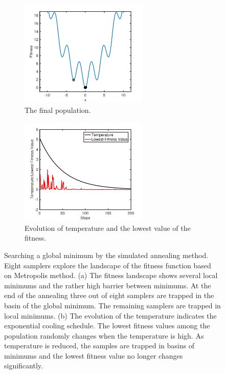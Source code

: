 \begin{example}
\begin{figure}
	\centering
	\begin{subfigure}{0.45\textwidth}
		\centering
		\includegraphics[width=2.4in]{19.Optimization/sa_fitness.pdf}
		\caption{The final population.}
		\label{fig:sa_fitness}
	\end{subfigure}
	\begin{subfigure}{0.45\textwidth}
		\centering
		\includegraphics[width=2.4in]{19.Optimization/sa_evolution.pdf}
		\caption{Evolution of temperature and the lowest value of the fitness.}
		\label{fig:sa_evolution}
	\end{subfigure}
\caption{Searching a global minimum by the simulated annealing method.  Eight samplers explore the landscape of the fitness function based on Metropolis method. (a) The fitness landscape shows several local minimums and the rather high barrier between minimums. At the end of the annealing three out of eight samplers are trapped in the basin of the global minimum.  The remaining samplers are trapped in local minimums. (b)  The evolution of the temperature indicates the exponential cooling schedule. The lowest fitness values among the population randomly changes when the temperature is high. As temperature is reduced, the samples are trapped in basins of minimums and the lowest fitness value no longer changes significantly.}
\label{fig:sa_example1}
\end{figure}

\end{example}

